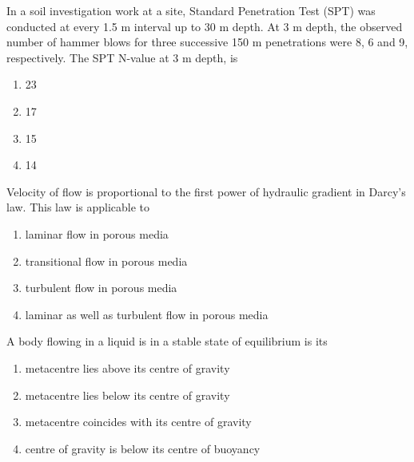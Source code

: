 \item In a soil investigation work at a site, Standard Penetration Test (SPT) was conducted at every 1.5 m  interval up to 30 m depth. At 3 m depth, the observed number of hammer blows for three successive 150 m penetrations were 8, 6 and 9, respectively. The SPT N-value at 3 m depth, is
\begin{multicols}{2}
    \begin{enumerate}
        \item 23
        \item 17
        \item 15
        \item 14
    \end{enumerate}
\end{multicols}

\item Velocity of flow is proportional to the first power of hydraulic gradient in Darcy's law. This law is applicable to
\begin{multicols}{2}
    \begin{enumerate}
        \item laminar flow in porous media
        \item transitional flow in porous media
        \item turbulent flow in porous media
        \item laminar as well as turbulent flow in porous media
    \end{enumerate}
\end{multicols}

\item A body flowing in a liquid is in a stable state of equilibrium is its
\begin{multicols}{2}
    \begin{enumerate}
        \item metacentre lies above its centre of gravity
        \item metacentre lies below its centre of gravity
        \item metacentre coincides with its centre of gravity
        \item centre of gravity is below its centre of buoyancy
    \end{enumerate}
\end{multicols}

